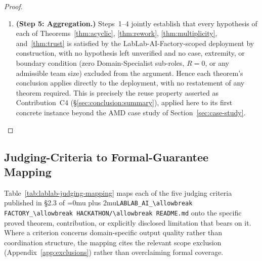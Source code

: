 \documentclass[12pt]{article}
\theoremstyle{definition}
\DeclareRobustCommand{\code}[1]{\begingroup\Urlmuskip=0mu plus 2mu\relax\nolinkurl{#1}\endgroup}
\newcommand{\LabLabFactoryReadme}{\code{LABLAB\_AI\_\allowbreak FACTORY\_\allowbreak HACKATHON/\allowbreak README.md}}
\begin{document}
\begin{proof}
\begin{enumerate}
    \item \textbf{(Step 5: Aggregation.)} Steps~1--4 jointly establish
          that every hypothesis of each of
          Theorems~\ref{thm:acyclic}, \ref{thm:rework},
          \ref{thm:multiplicity}, and~\ref{thm:trust} is satisfied by
          the LabLab-AI-Factory-scoped deployment by construction, with
          no hypothesis left unverified and no case, extremity, or
          boundary condition (zero Domain-Specialist sub-roles, $R=0$,
          or any admissible team size) excluded from the argument.
          Hence each theorem's conclusion applies directly to the
          deployment, with no restatement of any theorem required.
          This is precisely the reuse property asserted as
          Contribution~C4 (\S\ref{sec:conclusion:summary}), applied
          here to its first concrete instance beyond the AMD case
          study of Section~\ref{sec:case-study}. \qedhere
\end{enumerate}
\end{proof}

\subsection{Judging-Criteria to Formal-Guarantee Mapping}
\label{app:lablab-factory-judging}

Table~\ref{tab:lablab-judging-mapping} maps each of the five judging
criteria published in \S2.3 of \LabLabFactoryReadme{} onto the
specific proved theorem, contribution, or explicitly disclosed
limitation that bears on it.  Where a criterion concerns
domain-specific output quality rather than coordination structure, the
mapping cites the relevant scope exclusion (Appendix~\ref{app:exclusions})
rather than overclaiming formal coverage.
\end{document}
